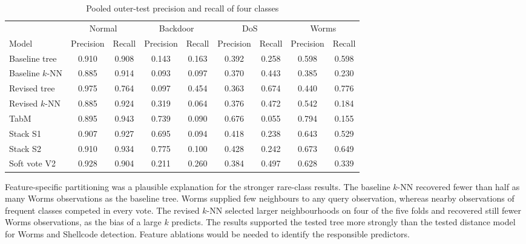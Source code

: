 \documentclass[conference]{IEEEtran}
\newcommand{\knn}{\mbox{$k$-NN}}
\begin{document}
\begin{table}[!t]
    \caption{Pooled outer-test precision and recall of four classes}
    \label{tab:pr}
    \centering\footnotesize
    \begin{tabular}{@{}lcccccccc@{}}
        \toprule
                      & \multicolumn{2}{c}{Normal} & \multicolumn{2}{c}{Backdoor} & \multicolumn{2}{c}{DoS} & \multicolumn{2}{c}{Worms} \\
        \cmidrule(lr){2-3}\cmidrule(lr){4-5}\cmidrule(lr){6-7}\cmidrule(l){8-9}
        Model         & Precision & Recall & Precision & Recall & Precision & Recall & Precision & Recall \\
        \midrule
        Baseline tree & 0.910 & 0.908 & 0.143 & 0.163 & 0.392 & 0.258 & 0.598 & 0.598 \\
        Baseline \knn & 0.885 & 0.914 & 0.093 & 0.097 & 0.370 & 0.443 & 0.385 & 0.230 \\
        Revised tree  & 0.975 & 0.764 & 0.097 & 0.454 & 0.363 & 0.674 & 0.440 & 0.776 \\
        Revised \knn  & 0.885 & 0.924 & 0.319 & 0.064 & 0.376 & 0.472 & 0.542 & 0.184 \\
        TabM          & 0.895 & 0.943 & 0.739 & 0.090 & 0.676 & 0.055 & 0.794 & 0.155 \\
        Stack S1      & 0.907 & 0.927 & 0.695 & 0.094 & 0.418 & 0.238 & 0.643 & 0.529 \\
        Stack S2      & 0.910 & 0.934 & 0.775 & 0.100 & 0.428 & 0.242 & 0.673 & 0.649 \\
        Soft vote V2  & 0.928 & 0.904 & 0.211 & 0.260 & 0.384 & 0.497 & 0.628 & 0.339 \\
        \bottomrule
    \end{tabular}
\end{table}

Feature-specific partitioning was a plausible explanation for the stronger rare-class results. The baseline \knn{} recovered fewer than half as many Worms observations as the baseline tree. Worms supplied few neighbours to any query observation, whereas nearby observations of frequent classes competed in every vote. The revised \knn{} selected larger neighbourhoods on four of the five folds and recovered still fewer Worms observations, as the bias of a large $k$ predicts. The results supported the tested tree more strongly than the tested distance model for Worms and Shellcode detection. Feature ablations would be needed to identify the responsible predictors.
\end{document}
